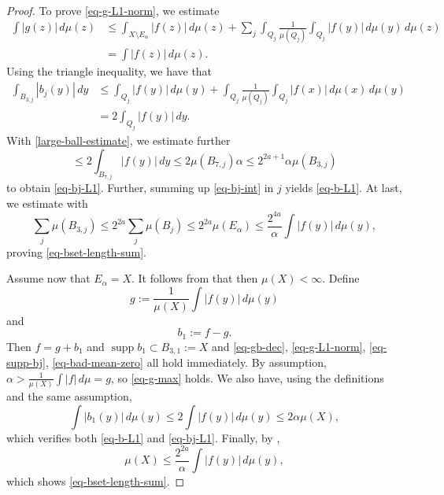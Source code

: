 \documentclass[10pt,a4paper]{article}
\theoremstyle{plain}
\theoremstyle{definition}
\numberwithin{equation}{subsection}
\DeclareMathOperator{\supp}{\operatorname{supp}}
\begin{document}
\begin{proof}
To prove \eqref{eq-g-L1-norm}, we estimate
\begin{align*}
    \int |g(z)|\, d\mu(z) &\le \int_{X\setminus E_\alpha} |f(z)|\, d\mu(z) + \sum_{j} \int_{Q_j}\frac{1}{\mu(Q_j)}\int_{Q_j}|f(y)|\, d\mu(y)\,d\mu(z) \\
    &= \int |f(z)|\,d\mu(z).
\end{align*}
Using the triangle inequality, we have that
\begin{align}
    \label{eq-bj-int}
    \int_{B_{3,j}} |b_j(y)|\, dy &\le \int_{Q_j} |f(y)|\, d\mu(y) + \int_{Q_j} \frac{1}{\mu(Q_j)}\int_{Q_j} |f(x)|\, d\mu(x)\, d\mu(y) \\
    &= 2 \int_{Q_j} |f(y)|\, dy.
\end{align}
With \eqref{large-ball-estimate}, we estimate further
\begin{equation}
    \le 2 \int_{B_{7,j}} |f(y)|\, dy \le 2\mu(B_{7,j})\alpha \le 2^{2a+1} \alpha \mu(B_{3,j})
\end{equation}
to obtain \eqref{eq-bj-L1}.
Further, summing up \eqref{eq-bj-int} in $j$ yields \eqref{eq-b-L1}.
At last, we estimate with 
\begin{equation}
    \sum_j \mu(B_{3,j}) \le 2^{2a} \sum_j \mu(B_j) \le 2^{2a} \mu(E_\alpha) \le \frac{2^{4a}}{\alpha}\int |f(y)|\, d\mu(y),
\end{equation}
proving \eqref{eq-bset-length-sum}.

Assume now that $E_\alpha = X$. It follows from  that then $\mu(X)<\infty$.
Define
\begin{equation*}
    g := \frac{1}{\mu(X)} \int |f(y)|\,d\mu(y)
\end{equation*}
and
\begin{equation*}
    b_1 := f - g.
\end{equation*}
Then $f = g + b_1$ and $\supp b_1 \subset B_{3,1}:=X$ and \eqref{eq-gb-dec}, \eqref{eq-g-L1-norm}, \eqref{eq-supp-bj}, \eqref{eq-bad-mean-zero} all hold immediately. By assumption, $\alpha>\frac{1}{\mu(X)}\int |f|\,d\mu = g$, so \eqref{eq-g-max} holds.
We also have, using the definitions and the same assumption,
\begin{equation}
    \int |b_1(y)|\, d\mu(y) \le 2 \int |f(y)|\,d\mu(y) \le 2\alpha\mu(X),
\end{equation}
which verifies both \eqref{eq-b-L1} and \eqref{eq-bj-L1}.
Finally, by ,
\begin{equation*}
    \mu(X) \le \frac{2^{2a}}{\alpha} \int |f(y)|\,d\mu(y),
\end{equation*}
which shows \eqref{eq-bset-length-sum}.
\end{proof}
\end{document}
